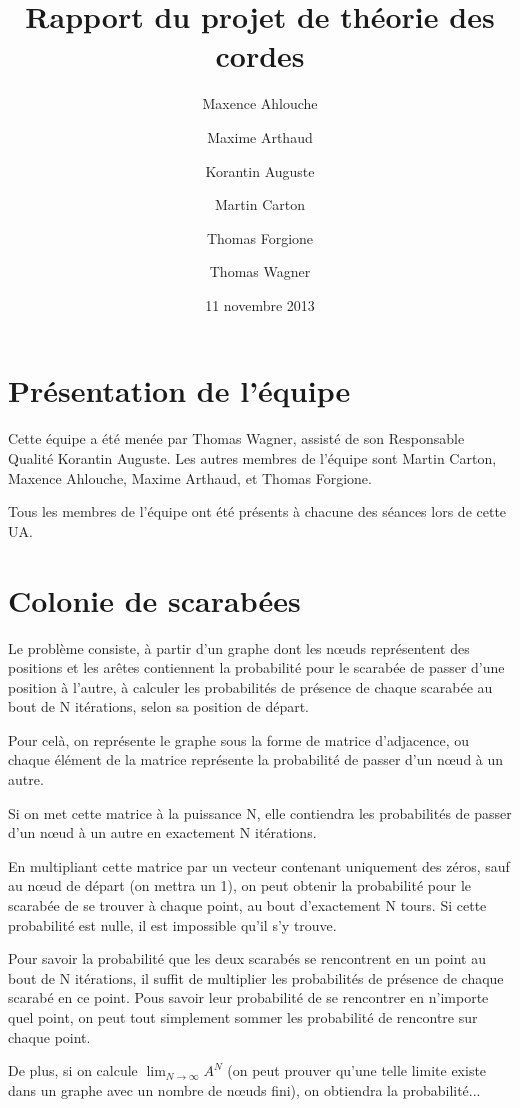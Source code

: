 \documentclass{scrartcl}
\begin{document}
\title{Rapport du projet de théorie des cordes}
\author{Maxence Ahlouche \and Maxime Arthaud \and Korantin Auguste
          \and Martin Carton \and Thomas Forgione \and Thomas Wagner}
\date{11 novembre 2013}
\maketitle
\tableofcontents
\newpage

\section{Présentation de l'équipe}
  Cette équipe a été menée par Thomas Wagner, assisté de son Responsable
  Qualité Korantin Auguste. Les autres membres de l'équipe sont Martin Carton,
  Maxence Ahlouche, Maxime Arthaud, et Thomas Forgione.

  Tous les membres de l'équipe ont été présents à chacune des séances lors de
  cette UA.

\section{Colonie de scarabées}

  Le problème consiste,  à partir d'un graphe dont les nœuds représentent des
  positions et les arêtes contiennent la probabilité pour le scarabée de passer
  d'une position à l'autre, à calculer les probabilités de présence de chaque scarabée
  au bout de N itérations, selon sa position de départ.

  Pour celà, on représente le graphe sous la forme de matrice d'adjacence, ou chaque
  élément de la matrice représente la probabilité de passer d'un nœud à un autre.

  Si on met cette matrice à la puissance N, elle contiendra les probabilités de passer
  d'un nœud à un autre en exactement N itérations.

  En multipliant cette matrice par un vecteur contenant uniquement des zéros, sauf au nœud
  de départ (on mettra un 1), on peut obtenir la probabilité pour le scarabée de se trouver
  à chaque point, au bout d'exactement N tours.
  Si cette probabilité est nulle, il est impossible qu'il s'y trouve.

  Pour savoir la probabilité que les deux scarabés se rencontrent en un point au bout de N itérations,
  il suffit de multiplier les probabilités de présence de chaque scarabé en ce point.
  Pous savoir leur probabilité de se rencontrer en n'importe quel point, on peut tout simplement sommer
  les probabilité de rencontre sur chaque point.

  De plus, si on calcule $\lim_{N \to \infty} A^N$ (on peut prouver qu'une telle limite existe dans un graphe
  avec un nombre de nœuds fini), on obtiendra la probabilité...
\end{document}
